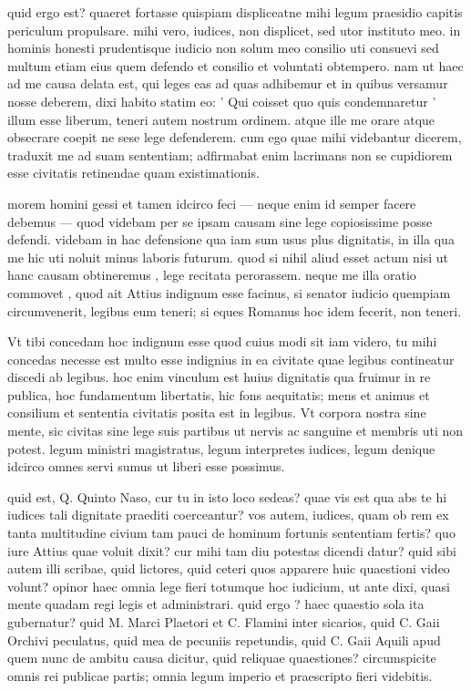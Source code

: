  quid ergo est? quaeret fortasse quispiam displiceatne mihi legum praesidio capitis periculum propulsare. mihi vero, iudices, non displicet, sed utor instituto meo. in hominis honesti prudentisque iudicio non solum meo consilio uti consuevi sed multum etiam eius quem defendo et consilio et voluntati obtempero. nam ut haec ad me causa delata est, qui leges eas ad quas adhibemur et in quibus versamur nosse deberem, dixi habito statim eo: ' Qui coisset quo quis condemnaretur ' illum esse liberum, teneri autem nostrum ordinem. atque ille me orare atque obsecrare coepit ne sese lege defenderem. cum ego quae mihi videbantur dicerem, traduxit me ad suam sententiam; adfirmabat enim lacrimans non se cupidiorem esse civitatis retinendae quam existimationis.

 morem homini gessi et tamen idcirco feci — neque enim id semper facere debemus — quod videbam per se ipsam causam sine lege copiosissime posse defendi. videbam in hac defensione qua iam sum usus plus dignitatis, in illa qua me hic uti noluit minus laboris futurum. quod si nihil aliud esset actum nisi ut hanc causam obtineremus , lege recitata perorassem. neque me illa oratio commovet , quod ait Attius indignum esse facinus, si senator iudicio quempiam circumvenerit, legibus eum teneri; si eques Romanus hoc idem fecerit, non teneri.

 Vt tibi concedam hoc indignum esse quod cuius modi sit iam videro, tu mihi concedas necesse est multo esse indignius in ea civitate quae legibus contineatur discedi ab legibus. hoc enim vinculum est huius dignitatis qua fruimur in re publica, hoc fundamentum libertatis, hic fons aequitatis; mens et animus et consilium et sententia civitatis posita est in legibus. Vt corpora nostra sine mente, sic civitas sine lege suis partibus ut nervis ac sanguine et membris uti non potest. legum ministri magistratus, legum interpretes iudices, legum denique idcirco omnes servi sumus ut liberi esse possimus.

 quid est, Q. Quinto Naso, cur tu in isto loco sedeas? quae vis est qua abs te hi iudices tali dignitate praediti coerceantur? vos autem, iudices, quam ob rem ex tanta multitudine civium tam pauci de hominum fortunis sententiam fertis? quo iure Attius quae voluit dixit? cur mihi tam diu potestas dicendi datur? quid sibi autem illi scribae, quid lictores, quid ceteri quos apparere huic quaestioni video volunt? opinor haec omnia lege fieri totumque hoc iudicium, ut ante dixi, quasi mente quadam regi legis et administrari. quid ergo ? haec quaestio sola ita gubernatur? quid M. Marci Plaetori et C. Flamini inter sicarios, quid C. Gaii Orchivi peculatus, quid mea de pecuniis repetundis, quid C. Gaii Aquili apud quem nunc de ambitu causa dicitur, quid reliquae quaestiones? circumspicite omnis rei publicae partis; omnia legum imperio et praescripto fieri videbitis.

